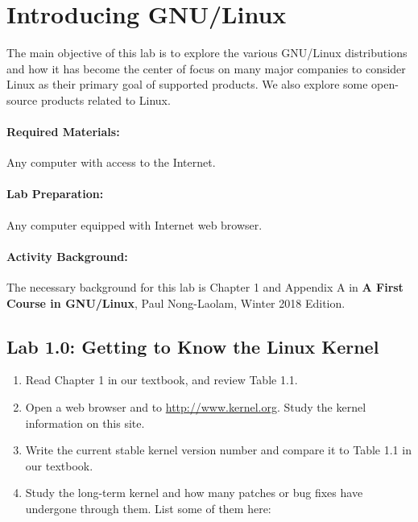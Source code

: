 %
\section{\Large{Introducing GNU/Linux}}

The main objective of this lab is to explore the various GNU/Linux distributions and how it has become the center of focus on many major companies to consider Linux as their primary goal of supported products. We also explore some open-source products related to Linux. 

\paragraph{Required Materials: } Any computer with access to the Internet. 
\paragraph{Lab Preparation: } Any computer equipped with Internet web browser. 
\paragraph{Activity Background: } The necessary background for this lab is Chapter 1 and Appendix A in {\bf{A First Course in GNU/Linux}}, Paul Nong-Laolam, Winter 2018 Edition. 

\subsection*{Lab 1.0: Getting to Know the Linux Kernel}

\begin{enumerate}
\item Read Chapter 1 in our textbook, and review Table 1.1.
\item Open a web browser and to {\url{http://www.kernel.org}}. Study the kernel information on this site. 
\item Write the current stable kernel version number and compare it to Table 1.1 in our textbook. 

\vspace{1in}

\item Study the long-term kernel and how many patches or bug fixes have undergone through them. List some of them here:

\vspace{1in}

\end{enumerate}

